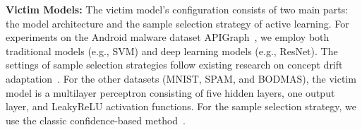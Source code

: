 \textbf{Victim Models:} 
The victim model’s configuration consists of two main parts: the model architecture and the sample selection strategy of active learning.
For experiments on the Android malware dataset APIGraph~\cite{2020-CCS-APIGraph}, we employ both traditional models (e.g., SVM) and deep learning models (e.g., ResNet).
The settings of sample selection strategies follow existing research on concept drift adaptation~\cite{2023-Usenix-chenyizhen,2022-SP-Trancending,2021-Usenix-CDAE,2023-survey-uncertainty-in-deep-neural-networks}.
For the other datasets (MNIST, SPAM, and BODMAS), the victim model is a multilayer perceptron consisting of five hidden layers, one output layer, and LeakyReLU activation functions.
For the sample selection strategy, we use the classic confidence-based method~\cite{2023-survey-uncertainty-in-deep-neural-networks}.
